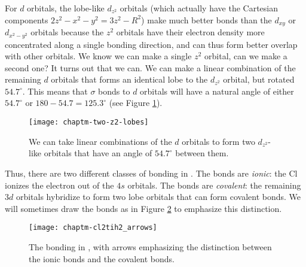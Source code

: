 For $d$ orbitals, the lobe-like $d_{z^2}$ orbitals (which actually
have the Cartesian components $2z^2-x^2-y^2 = 3z^2-R^2$) make much
better bonds than the $d_{xy}$ or $d_{x^2-y^2}$  orbitals because the
$z^2$ orbitals have their electron density more concentrated along
a single bonding direction, and can thus form better overlap with
other orbitals. We know we can make a single $z^2$ orbital, can we
make a second one? It turns out that we can. We can make a linear
combination of the remaining $d$ orbitals that forms an identical lobe
to the $d_{z^2}$ orbital, but rotated $54.7^\circ$. This means that
$\sigma$ bonds to $d$ orbitals will have a natural angle of either
$54.7^\circ$ or $180-54.7=125.3^\circ$ (see Figure
\ref{chaptm-two-z2-lobes}). 

\begin{figure}
\begin{center}
\texttt{[image: chaptm-two-z2-lobes]}
\end{center}
\caption{We can take linear combinations of the $d$ orbitals to form
  two $d_{z^2}$-like orbitals that have an angle of $54.7^\circ$
  between them.}
\label{chaptm-two-z2-lobes}
\end{figure}

Thus, there are two different classes of bonding in
. The  bonds are \emph{ionic}: the Cl
ionizes the electron out of the $4s$ orbitals. The  bonds
are \emph{covalent}: the remaining $3d$ orbitals hybridize to form two
lobe orbitals that can form covalent bonds. We will sometimes draw the
bonds as in Figure \ref{chaptm-cl2tih2_arrows} to emphasize this
distinction.

\begin{figure}
\begin{center}
\texttt{[image: chaptm-cl2tih2\_arrows]}
\end{center}
\caption{The bonding in , with arrows emphasizing the
  distinction between the ionic  bonds and the covalent
   bonds.}
\label{chaptm-cl2tih2_arrows}
\end{figure}

